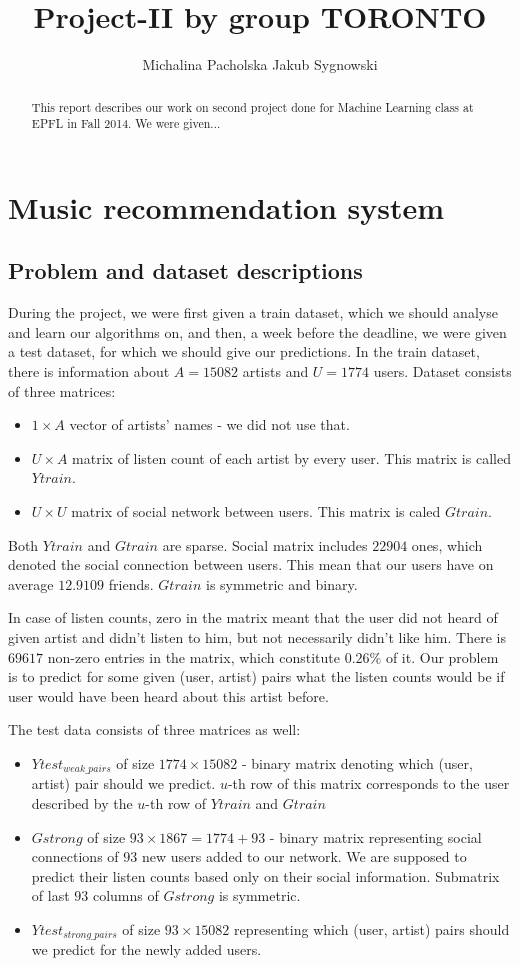 \documentclass{report}
\title{Project-II by group TORONTO}
\author{Michalina Pacholska \And Jakub Sygnowski}
\newcommand{\mychapter}[2]{
    \setcounter{chapter}{#1}
    \setcounter{section}{0}
    \chapter*{#2}
}
\begin{document}
\maketitle
\begin{abstract}
This report describes our work on second project done for Machine Learning class at EPFL in Fall 2014. We were given...
\end{abstract}
\begingroup
\renewcommand{\cleardoublepage}{}
\renewcommand{\clearpage}{}
\mychapter{1}{Music recommendation system}
\endgroup
\section{Problem and dataset descriptions}
During the project, we were first given a train dataset, which we should analyse and learn our algorithms on, and then, a week before the deadline, we were given a test dataset, for which we should give our predictions. In the train dataset, there is information about $A=15082$ artists and $U=1774$ users. Dataset consists of three matrices:
\begin{itemize}
    \item $1\times A$ vector of artists' names - we did not use that.
    \item $U \times A$ matrix of listen count of each artist by every user. This matrix is called $Ytrain$.
    \item $U \times U$ matrix of social network between users. This matrix is caled $Gtrain$.
\end{itemize}

Both $Ytrain$ and $Gtrain$ are sparse. Social matrix includes $22904$ ones, which denoted the social connection between users. This mean that our users have on average $12.9109$ friends. $Gtrain$ is symmetric and binary.

In case of listen counts, zero in the matrix meant that the user did not heard of given artist and didn't listen to him, but not necessarily didn't like him. There is $69617$ non-zero entries in the matrix, which constitute $0.26\%$ of it. Our problem is to predict for some given (user, artist) pairs what the listen counts would be if user would have been heard about this artist before.

The test data consists of three matrices as well:
\begin{itemize}
\item $Ytest_{weak\_pairs}$ of size $1774\times 15082$ - binary matrix denoting which (user, artist) pair should we predict. $u$-th row of this matrix corresponds to the user described by the $u$-th row of $Ytrain$ and $Gtrain$
\item $Gstrong$ of size $93 \times 1867 = 1774 + 93$ - binary matrix representing social connections of $93$ new users added to our network. We are supposed to predict their listen counts based only on their social information. Submatrix of last $93$ columns of $Gstrong$ is symmetric.
\item $Ytest_{strong\_pairs}$ of size $93 \times 15082$ representing which (user, artist) pairs should we predict for the newly added users.
\end{itemize}
\end{document}
